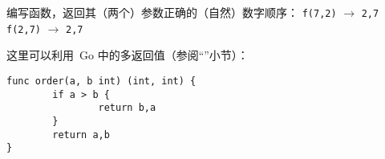 \begin{Exercise}[title={整数顺序},difficulty=0]
\label{ex:ordering function}
\Question 编写函数，返回其（两个）参数正确的（自然）数字顺序：
\newline 
\lstinline{f(7,2)} $\rightarrow$ \lstinline{2,7}\newline
\lstinline{f(2,7)} $\rightarrow$ \lstinline{2,7}\newline
\end{Exercise}

\begin{Answer}
\Question 
这里可以利用~Go 中的多返回值（参阅``''小节）：
\begin{lstlisting}
func order(a, b int) (int, int) {
        if a > b { 
                return b,a 
        }   
        return a,b 
}
\end{lstlisting}

\end{Answer}
